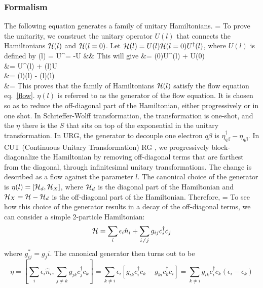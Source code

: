 \documentclass[12pt,twoside]{report}
\numberwithin{equation}{section}
\begin{document}
\subsubsection{Formalism}
The following equation generates a family of unitary Hamiltonians.
\beq[flow]
 = 
\eeq
To prove the unitarity\cite{kehrein}, we construct the unitary operator \(U(l)\) that connects the Hamiltonians \(\mathcal{H}(l)\) and \(\mathcal{H}(l=0)\). Let \(\mathcal{H}(l) = U(l)\mathcal{H}(l=0)U^\dagger(l)\), where \(U(l)\) is defined by
\beq
\eta(l) = U^\dagger = -U &&
\eeq
This will give
\beq
{} &= \ham(0)U^\dagger(l) + U\ham(0)\\
        &= U^\dagger\ham(l) + \ham(l)U\\
        &= \eta(l)\ham(l) - \ham(l)\eta(l)\\
        &=
\eeq
This proves that the family of Hamiltonians \(\mathcal{H}(l)\) satisfy the flow equation eq.~\ref{flow}. \(\eta(l)\) is referred to as the generator of the flow equation. It is chosen so as to reduce the off-diagonal part of the Hamiltonian, either progressively or in one shot. In Schrieffer-Wolff transformation, the transformation is one-shot, and the \(\eta\) there is the \(S\) that sits on top of the exponential in the unitary transformation. In URG, the generator to decouple one electron \(q\beta\) is \(\eta^\dagger_{q\beta} - \eta_{q\beta}\).
\pb In CUT (Continuous Unitary Transformation) RG \cite{glazek-wilson}, we progressively block-diagonalize the Hamiltonian by removing off-diagonal terms that are farthest from the diagonal, through infinitesimal unitary transformations. The change is described as a flow against the parameter \(l\). The canonical choice of the generator is \(\eta(l) = \left[{\mathcal{H}_d,\mathcal{H}_X}\right]\), where \(\mathcal{H}_d\) is the diagonal part of the Hamiltonian and \(\mathcal{H}_X = \mathcal{H} - \mathcal{H}_d\) is the off-diagonal part of the Hamiltonian. Therefore,
\beq[cut]
 = 
\eeq
To see how this choice of the generator results in a decay of the off-diagonal terms, we can consider a simple 2-particle Hamiltonian:
\begin{equation}
	\mathcal{H} = \sum_i \epsilon_i \hat n_i + \sum_{i\neq j} g_{ij}c^\dagger_i c_j
\end{equation}
where \(g_{ij}^* = g_ji\). The canonical generator then turns out to be 
\begin{equation}
	\eta = \left[\sum_i \epsilon_i \hat n_i, \sum_{j\neq k} g_{jk}c^\dagger_j c_k\right] = \sum_{k\neq i} \epsilon_i\left[g_{ik}c^\dagger_i c_k - g_{ki}c^\dagger_k c_i\right] = \sum_{k\neq i} g_{ik}c^\dagger_i c_k \left(\epsilon_i - \epsilon_k\right)
\end{equation}
\end{document}
